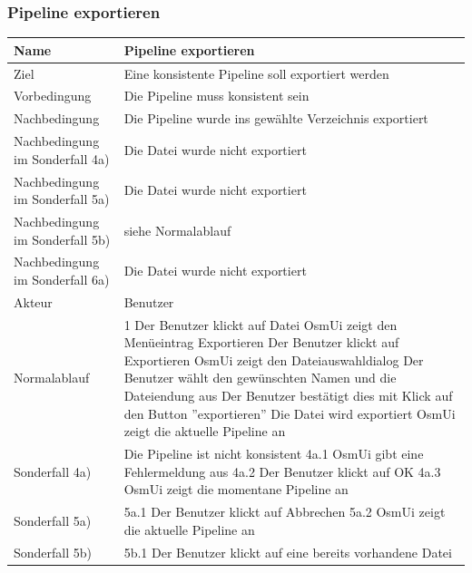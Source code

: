 \documentclass[a4paper,12pt]{scrartcl}
\begin{document}
\subsubsection{Pipeline exportieren}
\begin{center}
\begin{tabular}{|p{5cm}|p{10cm}|}
\hline Name & \textbf{Pipeline exportieren} \\ 
\hline Ziel & Eine konsistente Pipeline soll exportiert werden \\ 
\hline Vorbedingung & Die Pipeline muss konsistent sein \\ 
\hline Nachbedingung & Die Pipeline wurde ins gewählte Verzeichnis exportiert\\ 
\hline Nachbedingung im Sonderfall 4a) & Die Datei wurde nicht exportiert\\
\hline Nachbedingung im Sonderfall 5a)& Die Datei wurde nicht exportiert\\ 
\hline Nachbedingung im Sonderfall 5b)& siehe Normalablauf\\
\hline Nachbedingung im Sonderfall 6a)& Die Datei wurde nicht exportiert\\ 
\hline Akteur & Benutzer \\ 
\hline Normalablauf & 1 Der Benutzer klickt auf Datei
\newline 2 OsmUi zeigt den Menüeintrag Exportieren
\newline 3 Der Benutzer klickt auf Exportieren
\newline 4 OsmUi zeigt den Dateiauswahldialog
\newline 5 Der Benutzer wählt den gewünschten Namen und die Dateiendung aus
\newline 6 Der Benutzer bestätigt dies mit Klick auf den Button ''exportieren'' 
\newline 7 Die Datei wird exportiert
\newline 8 OsmUi zeigt die aktuelle Pipeline an\\
\hline Sonderfall 4a) & Die Pipeline ist nicht konsistent
\newline 4a.1 OsmUi gibt eine Fehlermeldung aus
\newline 4a.2 Der Benutzer klickt auf OK
\newline 4a.3 OsmUi zeigt die momentane Pipeline an\\
\hline Sonderfall 5a) & 5a.1 Der Benutzer klickt auf Abbrechen
\newline 5a.2 OsmUi zeigt die aktuelle Pipeline an\\
\hline Sonderfall 5b) & 5b.1 Der Benutzer klickt auf eine bereits vorhandene Datei

\end{tabular}
\end{center}
\end{document}
